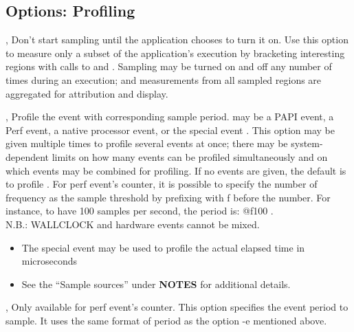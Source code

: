 \documentclass[english]{article}
\begin{document}
\subsection{Options: Profiling}

\begin{Description}

\item[\Opt{-ds}, \Opt{--delay-sampling}]
Don't start sampling until the application chooses to turn it on.
Use this option to measure only a subset of the application's execution by bracketing interesting regions
with calls to  and .
Sampling may be turned on and off any number of times during an execution;
and measurements from all sampled regions are aggregated for attribution and display.

\item[\OptArg{-e}{event\Lbr@period\Rbr}, \OptArg{--event}{event\Lbr@period\Rbr}]
Profile the  event with corresponding sample period.
 may be a PAPI event, a Perf event, a native processor event,
or the special event .
This option may be given multiple times to profile several events at once;
there may be system-dependent limits on how many events can be profiled simultaneously
and on which events may be combined for profiling.
If no events are given, the default is to profile .
For perf event's counter, it is possible to specify
the number of frequency as the sample threshold by
prefixing with f before the number.
For instance, to have 100 samples per second, the period
is: @f100 .\\
N.B.: WALLCLOCK and hardware events cannot be mixed.

\begin{itemize}
  \item The special event  may be used to profile the actual elapsed time in microseconds
  \item See the ``Sample sources'' under \textbf{NOTES} for additional details.
\end{itemize}

\item[\OptArg{-c}{number}, \OptArg{--count}{number}]
                       Only available for perf event's counter. This option
                       specifies the event period to sample. It uses the same
                       format of period as the option -e mentioned above.



\end{Description}
\end{document}
